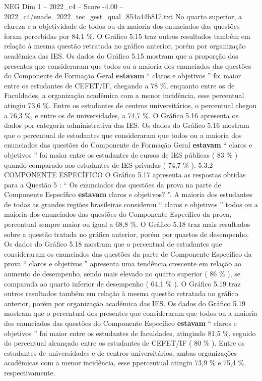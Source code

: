 \begin{textsample}{NEG Dim 1 – 2022\_c4 – Score -4.00 – 2022\_c4/enade\_2022\_tec\_gest\_qual\_854a44b817.txt}
No quarto superior, a clareza e a objetividade de todos ou da maioria dos enunciados das questões foram percebidas por 84,1 \%.
O Gráfico 5.15 traz outros resultados também em relação à mesma questão retratada no gráfico anterior, porém por organização acadêmica das IES.
Os dados do Gráfico 5.15 mostram que a proporção dos presentes que consideraram que todos ou a maioria dos enunciados das questões do Componente de Formação Geral \textbf{estavam} “ claros e objetivos ” foi maior entre os estudantes de CEFET/IF, chegando a 78 \%, enquanto entre os de Faculdades, a organização acadêmica com a menor incidência, esse percentual atingiu 73,6 \%.
Entre os estudantes de centros universitários, o percentual chegou a 76,3 \%, e entre os de universidades, a 74,7 \%.
O Gráfico 5.16 apresenta os dados por categoria administrativa das IES.
Os dados do Gráfico 5.16 mostram que o percentual de estudantes que consideraram que todos ou a maioria dos enunciados das questões do Componente de Formação Geral \textbf{estavam} “ claros e objetivos ” foi maior entre os estudantes de cursos de IES públicas ( 83 \% ) quando comparado aos estudantes de IES privadas ( 74,7 \% ). 5.3.2 COMPONENTE ESPECÍFICO O Gráfico 5.17 apresenta as respostas obtidas para a Questão 5 : “ Os enunciados das questões da prova na parte de Componente Específico \textbf{estavam} claros e objetivos? ”.
A maioria dos estudantes de todas as grandes regiões brasileiras considerou “ claros e objetivos ” todos ou a maioria dos enunciados das questões do Componente Específico da prova, percentual sempre maior ou igual a 68,8 \%.
O Gráfico 5.18 traz mais resultados sobre a questão tratada no gráfico anterior, porém por quartos de desempenho.
Os dados do Gráfico 5.18 mostram que o percentual de estudantes que consideraram os enunciados das questões da parte de Componente Específico da prova “ claros e objetivos ” apresenta uma tendência crescente em relação ao aumento de desempenho, sendo mais elevado no quarto superior ( 86 \% ), se comparada ao quarto inferior de desempenho ( 64,1 \% ).
O Gráfico 5.19 traz outros resultados também em relação à mesma questão retratada no gráfico anterior, porém por organização acadêmica das IES.
Os dados do Gráfico 5.19 mostram que o percentual dos presentes que consideraram que todos ou a maioria dos enunciados das questões do Componente Específico \textbf{estavam} “ claros e objetivos ” foi maior entre os estudantes de faculdades, atingindo 81,5 \%, seguido do percentual alcançado entre os estudantes de CEFET/IF ( 80 \% ).
Entre os estudantes de universidades e de centros universitários, ambas organizações acadêmicas com a menor incidência, esse ppercentual atingiu 73,9 \% e 75,4 \%, respectivamente.

\end{textsample}
